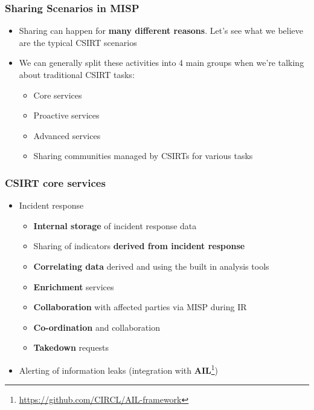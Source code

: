 \begin{frame}
\frametitle{Sharing Scenarios in MISP}
\begin{itemize}
	\item Sharing can happen for {\bf many different reasons}. Let's see what we believe are the typical CSIRT scenarios
        \item We can generally split these activities into 4 main groups when we're talking about traditional CSIRT tasks:
	\begin{itemize}
		\item Core services
		\item Proactive services
		\item Advanced services
		\item Sharing communities managed by CSIRTs for various tasks
	\end{itemize}
\end{itemize}
\end{frame}

\begin{frame}
\frametitle{CSIRT core services}
\begin{itemize}
	\item Incident response
	\begin{itemize}
		\item {\bf Internal storage} of incident response data
		\item Sharing of indicators {\bf derived from incident response}
		\item {\bf Correlating data} derived and using the built in analysis tools
		\item {\bf Enrichment} services
		\item {\bf Collaboration} with affected parties via MISP during IR
		\item {\bf Co-ordination} and collaboration
		\item {\bf Takedown} requests
	\end{itemize}
	\item Alerting of information leaks (integration with {\bf AIL}\footnote{\url{https://github.com/CIRCL/AIL-framework}})
\end{itemize}
\end{frame}

